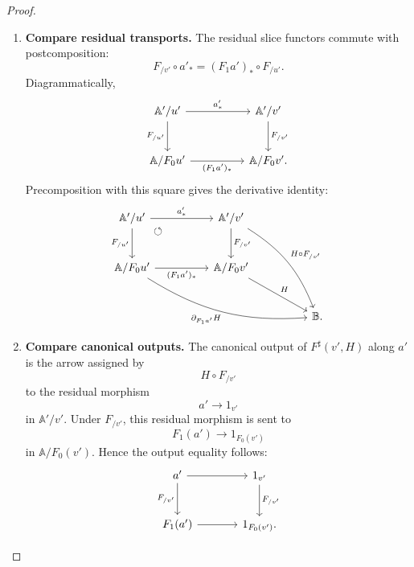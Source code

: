 \begin{proof}
    \leavevmode
    \begin{enumerate}
        \item \textbf{Compare residual transports.}
        The residual slice functors commute with postcomposition:
        \[
            F_{/v'}\circ a'_*
            =
            (F_1a')_*\circ F_{/u'}.
        \]
        Diagrammatically,
        \[
        \begin{tikzcd}[column sep=huge, row sep=large]
            \mathbb A'/u'
                \arrow[r, "a'_*"]
                \arrow[d, "F_{/u'}"']
            &
            \mathbb A'/v'
                \arrow[d, "F_{/v'}"]
            \\
            \mathbb A/F_0u'
                \arrow[r, "{(F_1a')_*}"']
            &
            \mathbb A/F_0v'.
        \end{tikzcd}
        \]
        Precomposition with this square gives the derivative identity:
        \[
        \begin{tikzcd}[column sep=huge, row sep=large]
            \mathbb A'/u'
                \arrow[r, "a'_*"]
                \arrow[d, "F_{/u'}"']
                \arrow[dr, phantom, "\circlearrowleft", very near start]
            &
            \mathbb A'/v'
                \arrow[d, "F_{/v'}"]
                \arrow[ddr, "{H\circ F_{/v'}}", bend left=18]
            \\
            \mathbb A/F_0u'
                \arrow[r, "{(F_1a')_*}"']
                \arrow[drr, "{\partial_{F_1a'}H}"', bend right=18]
            &
            \mathbb A/F_0v'
                \arrow[dr, "H"]
            \\
            &&
            \mathbb B .
        \end{tikzcd}
        \]

        \item \textbf{Compare canonical outputs.}
        The canonical output of \(F^\sharp(v',H)\) along \(a'\) is the arrow
        assigned by
        \[
            H\circ F_{/v'}
        \]
        to the residual morphism
        \[
            a'\to 1_{v'}
        \]
        in \(\mathbb A'/v'\). Under \(F_{/v'}\), this residual morphism is sent
        to
        \[
            F_1(a')\to 1_{F_0(v')}
        \]
        in \(\mathbb A/F_0(v')\). Hence the output equality follows:
        \[
        \begin{tikzcd}[column sep=large, row sep=large]
            a'
                \arrow[r]
                \arrow[d, "{F_{/v'}}"']
            &
            1_{v'}
                \arrow[d, "{F_{/v'}}"]
            \\
            F_1(a')
                \arrow[r]
            &
            1_{F_0(v')} .
        \end{tikzcd}
        \]


\end{enumerate}
\end{proof}
